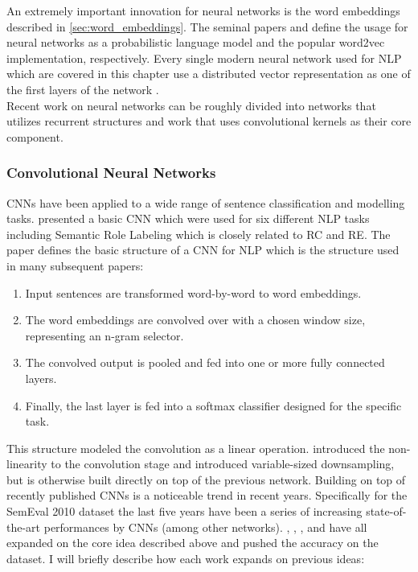 An extremely important innovation for neural networks is the word embeddings described in \autoref{sec:word_embeddings}. The seminal papers \cite{bengio2003} and \cite{mikolov2013} define the usage for neural networks as a probabilistic language model and the popular word2vec implementation, respectively. Every single modern neural network used for NLP which are covered in this chapter use a distributed vector representation as one of the first layers of the network \cite{att_cnn} \cite{cnn_rank} \cite{re_lstm} \cite{re_cnn}. \\ %


Recent work on neural networks can be roughly divided into networks that utilizes recurrent structures and work that uses convolutional kernels as their core component. 

\subsubsection{Convolutional Neural Networks}

CNNs have been applied to a wide range of sentence classification and modelling tasks. \cite{collobert2008} presented a basic CNN which were used for six different NLP tasks including Semantic Role Labeling which is closely related to RC and RE. The paper defines the basic structure of a CNN for NLP which is the structure used in many subsequent papers:

\begin{enumerate}
\item Input sentences are transformed word-by-word to word embeddings.
\item The word embeddings are convolved over with a chosen window size, representing an n-gram selector.
\item The convolved output is pooled and fed into one or more fully connected layers.
\item Finally, the last layer is fed into a softmax classifier designed for the specific task.

\end{enumerate}

This structure modeled the convolution as a linear operation. \cite{kalchbrenner2014} introduced the non-linearity to the convolution stage and introduced variable-sized downsampling, but is otherwise built directly on top of the previous network. 
Building on top of recently published CNNs is a noticeable trend in recent years. Specifically for the SemEval 2010 dataset the last five years have been a series of increasing state-of-the-art performances by CNNs (among other networks). \cite{zeng2014}, \cite{re_cnn}, \cite{cnn_rank}, \cite{xu2015} and \cite{att_cnn} have all expanded on the core idea described above and pushed the accuracy on the dataset. I will briefly describe how each work expands on previous ideas:


